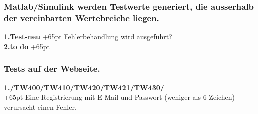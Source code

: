 \documentclass[fontsize = 12pt, paper = a4]{scrreprt}
\begin{document}
\subsubsection*{Matlab/Simulink werden Testwerte generiert, die ausserhalb der vereinbarten Wertebreiche liegen. }


\textbf{1.Test-neu}
\hangindent+65pt 
Fehlerbehandlung wird ausgeführt?\\

\textbf{2.to do}
\hangindent+65pt 


\subsubsection*{Tests auf der Webseite.}


\textbf{1./TW400/TW410/TW420/TW421/TW430/}\\
\hangindent+65pt 
Eine Registrierung mit E-Mail und Passwort (weniger als 6 Zeichen) verursacht einen Fehler.\\


\end{document}
